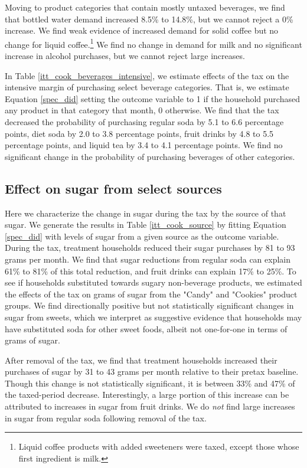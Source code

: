 \documentclass[12pt]{article}
\begin{document}
Moving to product categories that contain mostly untaxed beverages, we find that bottled water demand increased 8.5\% to 14.8\%, but we cannot reject a 0\% increase. We find weak evidence of increased demand for solid coffee but no change for liquid coffee.\footnote{Liquid coffee products with added sweeteners were taxed, except those whose first ingredient is milk.} We find no change in demand for milk and no significant increase in alcohol purchases, but we cannot reject large increases.

In Table \ref{itt_cook_beverages_intensive}, we estimate effects of the tax on the intensive margin of purchasing select beverage categories. That is, we estimate Equation \ref{spec_did} setting the outcome variable to 1 if the household purchased any product in that category that month, 0 otherwise. We find that the tax decreased the probability of purchasing regular soda by 5.1 to 6.6 percentage points, diet soda by 2.0 to 3.8 percentage points, fruit drinks by 4.8 to 5.5 percentage points, and liquid tea by 3.4 to 4.1 percentage points. We find no significant change in the probability of purchasing beverages of other categories.

\subsection{Effect on sugar from select sources}

Here we characterize the change in sugar during the tax by the source of that sugar. We generate the results in Table \ref{itt_cook_source} by fitting Equation \ref{spec_did} with levels of sugar from a given source as the outcome variable. During the tax, treatment households reduced their sugar purchases by 81 to 93 grams per month. We find that sugar reductions from regular soda can explain 61\% to 81\% of this total reduction, and fruit drinks can explain 17\% to 25\%. To see if households substituted towards sugary non-beverage products, we estimated the effects of the tax on grams of sugar from the "Candy" and "Cookies" product groups. We find directionally positive but not statistically significant changes in sugar from sweets, which we interpret as suggestive evidence that households may have substituted soda for other sweet foods, albeit not one-for-one in terms of grams of sugar.

After removal of the tax, we find that treatment households increased their purchases of sugar by 31 to 43 grams per month relative to their pretax baseline. Though this change is not statistically significant, it is between 33\% and 47\% of the taxed-period decrease. Interestingly, a large portion of this increase can be attributed to increases in sugar from fruit drinks. We do \textit{not} find large increases in sugar from regular soda following removal of the tax.
\end{document}
